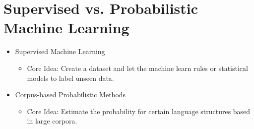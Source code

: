     \section{Supervised vs. Probabilistic Machine Learning} %
        \begin{itemize}
        	\item Supervised Machine Learning
        		\begin{itemize}
        			\item Core Idea: Create a dataset and let the machine learn rules or statistical models to label unseen data.
        		\end{itemize}
        	\item Corpus-based Probabilistic Methods
        		\begin{itemize}
        			\item Core Idea: Estimate the probability for certain language structures based in large corpora.
        		\end{itemize}
        \end{itemize}
